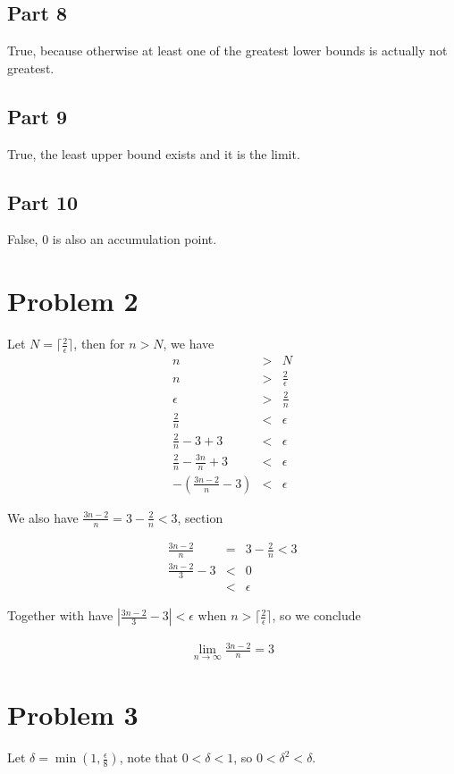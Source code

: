 \documentclass{article}
\begin{document}
\subsection*{Part 8}
True, because otherwise at least one of the greatest lower bounds is actually not greatest.
\subsection*{Part 9}
True, the least upper bound exists and it is the limit.
\subsection*{Part 10}
False, 0 is also an accumulation point.

\section*{Problem 2}
Let $ N = \lceil \frac{2}{\epsilon} \rceil $, then for $ n > N $, we have
\begin{eqnarray*}
              n & > & N \\
              n & > & \frac{2}{\epsilon} \\
       \epsilon & > & \frac{2}{n} \\
    \frac{2}{n} & < & \epsilon \\
    \frac{2}{n} - 3 + 3 & < & \epsilon \\
    \frac{2}{n} - \frac{3n}{n} + 3 & < & \epsilon \\
    -(\frac{3n - 2}{n} - 3) & < & \epsilon
\end{eqnarray*}

We also have $ \frac{3n - 2}{n} = 3 - \frac{2}{n} < 3 $, section

\begin{eqnarray*}
      \frac{3n - 2}{n} &=& 3 - \frac{2}{n} < 3 \\
  \frac{3n - 2}{3} - 3 &<& 0 \\
                       &<& \epsilon
\end{eqnarray*}

Together with have $ |\frac{3n - 2}{3} - 3| < \epsilon $ when $ n > \lceil \frac{2}{\epsilon} \rceil $, so we conclude

\begin{eqnarray}
    \lim_{n \to \infty} \frac{3n - 2}{n} = 3
\end{eqnarray}

\section*{Problem 3}
Let $ \delta = \min (1, \frac{\epsilon}{8}) $, note that $ 0 < \delta < 1 $, so $ 0 < \delta^2 < \delta $.
\end{document}
